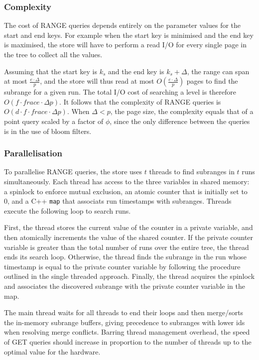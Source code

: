 \documentclass{acm}
\begin{document}
\subsubsection{Complexity}

The cost of RANGE queries depends entirely on the parameter values for the start and end keys. For example when the start key is minimised and the end key is maximised, the store will have to perform a read I/O for every single page in the tree to collect all the values.

Assuming that the start key is $k_s$ and the end key is $k_s + \Delta$, the range can span at most $ \frac{e \cdot \Delta}{p}$, and the store will thus read at most $O(\frac{e \cdot \Delta}{p})$ pages to find the subrange for a given run. The total I/O cost of searching a level is therefore $O(f \cdot frac{e \cdot \Delta}{p})$. It follows that the complexity of RANGE queries is $O(d \cdot f \cdot frac{e \cdot \Delta}{p})$. When $\Delta < p$, the page size, the complexity equals that of a point query scaled by a factor of $\phi$, since the only difference between the queries is in the use of bloom filters.

\subsubsection{Parallelisation}

To parallelise RANGE queries, the store uses $t$ threads to find subranges in $t$ runs simultaneously. Each thread has access to the three variables in shared memory: a spinlock to enforce mutual exclusion, an atomic counter that is initially set to 0, and a C++ \texttt{map} that associats run timestamps with subranges. Threads execute the following loop to search runs.

First, the thread stores the current value of the counter in a private variable, and then atomically increments the value of the shared counter. If the private counter variable is greater than the total number of runs over the entire tree, the thread ends its search loop. Otherwise, the thread finds the subrange in the run whose timestamp is equal to the private counter variable by following the procedure outlined in the single threaded approach. Finally, the thread acquires the spinlock and associates the discovered subrange with the private counter variable in the map. 

The main thread waits for all threads to end their loops and then merge/sorts the in-memory subrange buffers, giving precedence to subranges with lower ids when resolving merge conflicts. Barring thread management overhead, the speed of GET queries should increase in proportion to the number of threads up to the optimal value for the hardware.
\end{document}
